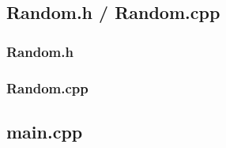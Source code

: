 \documentclass{article}
\numberwithin{equation}{section}
\numberwithin{figure}{section}
\begin{document}
	\subsection{Random.h / Random.cpp}
	\subsubsection{Random.h}
	
	\newpage
	\subsubsection{Random.cpp}
	
	\newpage
	\subsection{main.cpp}
	
	
\end{document}
